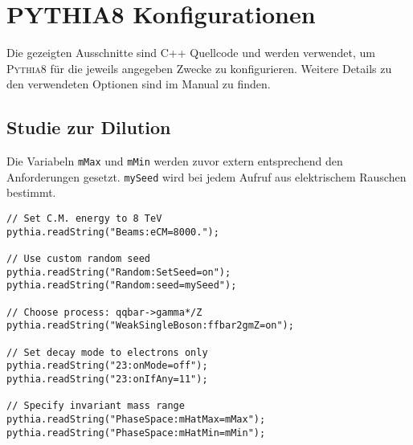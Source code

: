 


\chapter{\textsc{PYTHIA8} Konfigurationen}

Die gezeigten Ausschnitte sind C++ Quellcode und werden verwendet, um
\textsc{Pythia8} für die jeweils angegeben Zwecke zu konfigurieren. Weitere
Details zu den verwendeten Optionen sind im Manual zu finden.

\section{Studie zur Dilution}
Die Variabeln \texttt{mMax} und \texttt{mMin} werden zuvor extern entsprechend
den Anforderungen gesetzt. \texttt{mySeed} wird bei jedem Aufruf aus
elektrischem Rauschen bestimmt.

\lstset{language=C++}
\begin{small}
\begin{lstlisting}[frame=single]
// Set C.M. energy to 8 TeV
pythia.readString("Beams:eCM=8000.");

// Use custom random seed
pythia.readString("Random:SetSeed=on");
pythia.readString("Random:seed=mySeed");

// Choose process: qqbar->gamma*/Z
pythia.readString("WeakSingleBoson:ffbar2gmZ=on");

// Set decay mode to electrons only
pythia.readString("23:onMode=off");
pythia.readString("23:onIfAny=11");

// Specify invariant mass range
pythia.readString("PhaseSpace:mHatMax=mMax");
pythia.readString("PhaseSpace:mHatMin=mMin");
\end{lstlisting}
\end{small}
